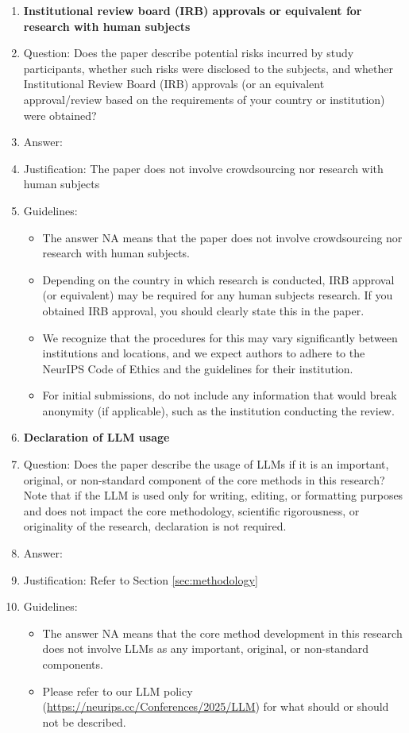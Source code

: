 \documentclass{article}
\begin{document}
\begin{enumerate}
\item {\bf Institutional review board (IRB) approvals or equivalent for research with human subjects}
    \item[] Question: Does the paper describe potential risks incurred by study participants, whether such risks were disclosed to the subjects, and whether Institutional Review Board (IRB) approvals (or an equivalent approval/review based on the requirements of your country or institution) were obtained?
    \item[] Answer: \answerNA{} %
    \item[] Justification: The paper does not involve crowdsourcing nor research with human subjects
    \item[] Guidelines:
    \begin{itemize}
        \item The answer NA means that the paper does not involve crowdsourcing nor research with human subjects.
        \item Depending on the country in which research is conducted, IRB approval (or equivalent) may be required for any human subjects research. If you obtained IRB approval, you should clearly state this in the paper. 
        \item We recognize that the procedures for this may vary significantly between institutions and locations, and we expect authors to adhere to the NeurIPS Code of Ethics and the guidelines for their institution. 
        \item For initial submissions, do not include any information that would break anonymity (if applicable), such as the institution conducting the review.
    \end{itemize}

\item {\bf Declaration of LLM usage}
    \item[] Question: Does the paper describe the usage of LLMs if it is an important, original, or non-standard component of the core methods in this research? Note that if the LLM is used only for writing, editing, or formatting purposes and does not impact the core methodology, scientific rigorousness, or originality of the research, declaration is not required.
    \item[] Answer: \answerNA{} %
    \item[] Justification: Refer to Section \ref{sec:methodology}
    \item[] Guidelines:
    \begin{itemize}
        \item The answer NA means that the core method development in this research does not involve LLMs as any important, original, or non-standard components.
        \item Please refer to our LLM policy (\url{https://neurips.cc/Conferences/2025/LLM}) for what should or should not be described.
    \end{itemize}

\end{enumerate}
\end{document}
